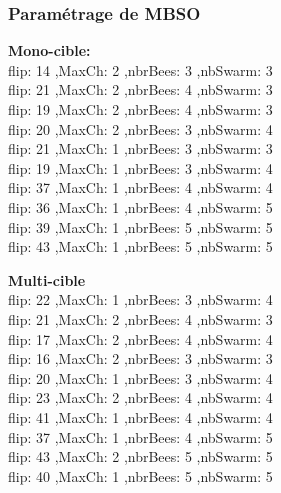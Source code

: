 \subsubsection{Paramétrage de MBSO}
\noindent
\begin{minipage}[t]{0.55\textwidth}
	\textbf{Mono-cible:} \\
	 flip: 14 ,MaxCh: 2 ,nbrBees: 3 ,nbSwarm: 3\\
	 flip: 21 ,MaxCh: 2 ,nbrBees: 4 ,nbSwarm: 3\\
	 flip: 19 ,MaxCh: 2 ,nbrBees: 4 ,nbSwarm: 3\\
	 flip: 20 ,MaxCh: 2 ,nbrBees: 3 ,nbSwarm: 4\\
	 flip: 21 ,MaxCh: 1 ,nbrBees: 3 ,nbSwarm: 3\\
	 flip: 19 ,MaxCh: 1 ,nbrBees: 3 ,nbSwarm: 4\\
	 flip: 37 ,MaxCh: 1 ,nbrBees: 4 ,nbSwarm: 4\\
	 flip: 36 ,MaxCh: 1 ,nbrBees: 4 ,nbSwarm: 5\\
	 flip: 39 ,MaxCh: 1 ,nbrBees: 5 ,nbSwarm: 5\\
	 flip: 43 ,MaxCh: 1 ,nbrBees: 5 ,nbSwarm: 5\\

\end{minipage}\hfill
\hspace{0.2cm}
\begin{minipage}[t]{0.55\textwidth}
	\textbf{Multi-cible}\\
	 flip: 22 ,MaxCh: 1 ,nbrBees: 3 ,nbSwarm: 4\\
	 flip: 21 ,MaxCh: 2 ,nbrBees: 4 ,nbSwarm: 3\\
	 flip: 17 ,MaxCh: 2 ,nbrBees: 4 ,nbSwarm: 4\\
	 flip: 16 ,MaxCh: 2 ,nbrBees: 3 ,nbSwarm: 3\\
	 flip: 20 ,MaxCh: 1 ,nbrBees: 3 ,nbSwarm: 4\\
	 flip: 23 ,MaxCh: 2 ,nbrBees: 4 ,nbSwarm: 4\\
	 flip: 41 ,MaxCh: 1 ,nbrBees: 4 ,nbSwarm: 4\\
	 flip: 37 ,MaxCh: 1 ,nbrBees: 4 ,nbSwarm: 5\\
	 flip: 43 ,MaxCh: 2 ,nbrBees: 5 ,nbSwarm: 5\\
	 flip: 40 ,MaxCh: 1 ,nbrBees: 5 ,nbSwarm: 5\\

	
\end{minipage}\hfill

 
